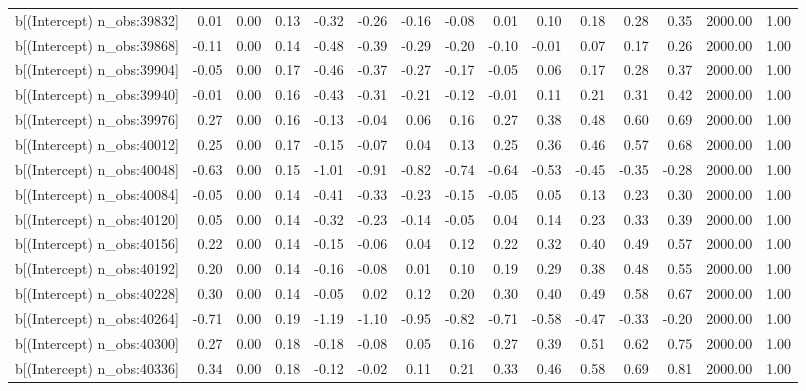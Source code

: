 \begin{table}[ht]
\begin{tabular}{rrrrrrrrrrrrrrr}
  b[(Intercept) n\_obs:39832] & 0.01 & 0.00 & 0.13 & -0.32 & -0.26 & -0.16 & -0.08 & 0.01 & 0.10 & 0.18 & 0.28 & 0.35 & 2000.00 & 1.00 \\ 
  b[(Intercept) n\_obs:39868] & -0.11 & 0.00 & 0.14 & -0.48 & -0.39 & -0.29 & -0.20 & -0.10 & -0.01 & 0.07 & 0.17 & 0.26 & 2000.00 & 1.00 \\ 
  b[(Intercept) n\_obs:39904] & -0.05 & 0.00 & 0.17 & -0.46 & -0.37 & -0.27 & -0.17 & -0.05 & 0.06 & 0.17 & 0.28 & 0.37 & 2000.00 & 1.00 \\ 
  b[(Intercept) n\_obs:39940] & -0.01 & 0.00 & 0.16 & -0.43 & -0.31 & -0.21 & -0.12 & -0.01 & 0.11 & 0.21 & 0.31 & 0.42 & 2000.00 & 1.00 \\ 
  b[(Intercept) n\_obs:39976] & 0.27 & 0.00 & 0.16 & -0.13 & -0.04 & 0.06 & 0.16 & 0.27 & 0.38 & 0.48 & 0.60 & 0.69 & 2000.00 & 1.00 \\ 
  b[(Intercept) n\_obs:40012] & 0.25 & 0.00 & 0.17 & -0.15 & -0.07 & 0.04 & 0.13 & 0.25 & 0.36 & 0.46 & 0.57 & 0.68 & 2000.00 & 1.00 \\ 
  b[(Intercept) n\_obs:40048] & -0.63 & 0.00 & 0.15 & -1.01 & -0.91 & -0.82 & -0.74 & -0.64 & -0.53 & -0.45 & -0.35 & -0.28 & 2000.00 & 1.00 \\ 
  b[(Intercept) n\_obs:40084] & -0.05 & 0.00 & 0.14 & -0.41 & -0.33 & -0.23 & -0.15 & -0.05 & 0.05 & 0.13 & 0.23 & 0.30 & 2000.00 & 1.00 \\ 
  b[(Intercept) n\_obs:40120] & 0.05 & 0.00 & 0.14 & -0.32 & -0.23 & -0.14 & -0.05 & 0.04 & 0.14 & 0.23 & 0.33 & 0.39 & 2000.00 & 1.00 \\ 
  b[(Intercept) n\_obs:40156] & 0.22 & 0.00 & 0.14 & -0.15 & -0.06 & 0.04 & 0.12 & 0.22 & 0.32 & 0.40 & 0.49 & 0.57 & 2000.00 & 1.00 \\ 
  b[(Intercept) n\_obs:40192] & 0.20 & 0.00 & 0.14 & -0.16 & -0.08 & 0.01 & 0.10 & 0.19 & 0.29 & 0.38 & 0.48 & 0.55 & 2000.00 & 1.00 \\ 
  b[(Intercept) n\_obs:40228] & 0.30 & 0.00 & 0.14 & -0.05 & 0.02 & 0.12 & 0.20 & 0.30 & 0.40 & 0.49 & 0.58 & 0.67 & 2000.00 & 1.00 \\ 
  b[(Intercept) n\_obs:40264] & -0.71 & 0.00 & 0.19 & -1.19 & -1.10 & -0.95 & -0.82 & -0.71 & -0.58 & -0.47 & -0.33 & -0.20 & 2000.00 & 1.00 \\ 
  b[(Intercept) n\_obs:40300] & 0.27 & 0.00 & 0.18 & -0.18 & -0.08 & 0.05 & 0.16 & 0.27 & 0.39 & 0.51 & 0.62 & 0.75 & 2000.00 & 1.00 \\ 
  b[(Intercept) n\_obs:40336] & 0.34 & 0.00 & 0.18 & -0.12 & -0.02 & 0.11 & 0.21 & 0.33 & 0.46 & 0.58 & 0.69 & 0.81 & 2000.00 & 1.00 \\ 

\end{tabular}
\end{table}
